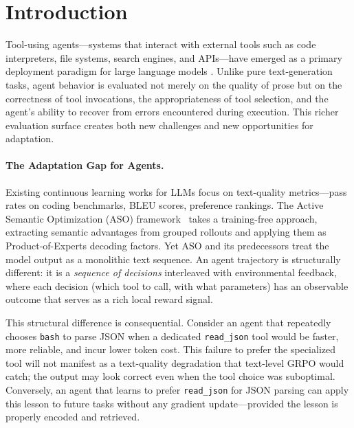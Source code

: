 \section{Introduction}

\label{sec:intro}

Tool-using agents---systems that interact with external tools such as code
interpreters, file systems, search engines, and APIs---have emerged as a
primary deployment paradigm for large language models
\cite{schick2023toolformer, yang2024intercode, yao2023react}. Unlike pure
text-generation tasks, agent behavior is evaluated not merely on the quality of
prose but on the correctness of tool invocations, the appropriateness of tool
selection, and the agent's ability to recover from errors encountered during
execution. This richer evaluation surface creates both new challenges and new
opportunities for adaptation.

\paragraph{The Adaptation Gap for Agents.}
Existing continuous learning works for LLMs focus on text-quality
metrics---pass rates on coding benchmarks, BLEU scores, preference rankings.
The Active Semantic Optimization (ASO) framework~\cite{hanzo2026aso} takes a
training-free approach, extracting semantic advantages from grouped rollouts and
applying them as Product-of-Experts decoding factors. Yet ASO and its
predecessors treat the model output as a monolithic text sequence. An agent
trajectory is structurally different: it is a \emph{sequence of decisions}
interleaved with environmental feedback, where each decision (which tool to
call, with what parameters) has an observable outcome that serves as a rich
local reward signal.

This structural difference is consequential. Consider an agent that repeatedly
chooses \texttt{bash} to parse JSON when a dedicated \texttt{read\_json} tool
would be faster, more reliable, and incur lower token cost. This failure to
prefer the specialized tool will not manifest as a text-quality degradation
that text-level GRPO would catch; the output may look correct even when the
tool choice was suboptimal. Conversely, an agent that learns to prefer
\texttt{read\_json} for JSON parsing can apply this lesson to future tasks
without any gradient update---provided the lesson is properly encoded and
retrieved.

